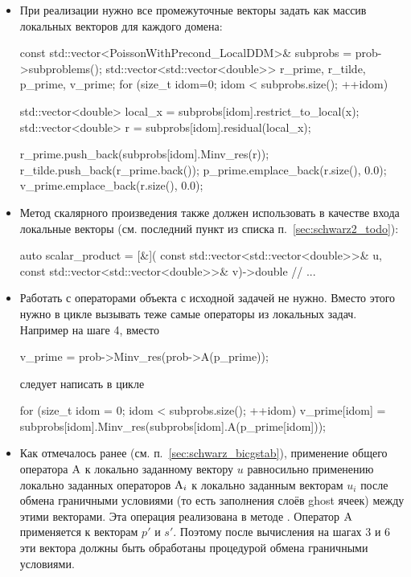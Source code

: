 \begin{itemize}

\item При реализации  нужно все промежуточные векторы задать как массив локальных векторов для каждого домена:
\begin{cppcode}
const std::vector<PoissonWithPrecond_LocalDDM>& subprobs = prob->subproblems();
std::vector<std::vector<double>> r_prime, r_tilde, p_prime, v_prime;
for (size_t idom=0; idom < subprobs.size(); ++idom){
	std::vector<double> local_x = subprobs[idom].restrict_to_local(x);
	std::vector<double> r = subprobs[idom].residual(local_x);

	r_prime.push_back(subprobs[idom].Minv_res(r));
	r_tilde.push_back(r_prime.back());
	p_prime.emplace_back(r.size(), 0.0);
	v_prime.emplace_back(r.size(), 0.0);
}
\end{cppcode}

\item Метод скалярного произведения также должен использовать в качестве входа локальные векторы (см. последний пункт из списка п.~\ref{sec:schwarz2_todo}):
\begin{cppcode}
auto scalar_product = [&](
	const std::vector<std::vector<double>>& u,
	const std::vector<std::vector<double>>& v)->double{
    // ...
}
\end{cppcode}

\item Работать с операторами объекта с исходной задачей  не нужно.
Вместо этого нужно в цикле вызывать теже самые операторы из локальных задач. Например на шаге 4, вместо
\begin{cppcode}
v_prime = prob->Minv_res(prob->A(p_prime));
\end{cppcode}
следует написать в цикле
\begin{cppcode}
for (size_t idom = 0; idom < subprobs.size(); ++idom){
	v_prime[idom] = subprobs[idom].Minv_res(subprobs[idom].A(p_prime[idom]));
}
\end{cppcode}

\item Как отмечалось ранее (см. п.~\ref{sec:schwarz_bicgstab}), применение общего оператора ${\rm A}$ к локально заданному вектору $u$
равносильно применению локально заданных операторов ${\rm A}_i$ к локально заданным векторам $u_i$
после обмена граничными условиями (то есть заполнения слоёв ghost ячеек) между этими векторами.
Эта операция реализована в методе .
Оператор ${\rm A}$ применяется к векторам $p'$ и $s'$. Поэтому после вычисления на шагах 3 и 6 эти вектора должны быть обработаны процедурой обмена граничными условиями.


\end{itemize}
